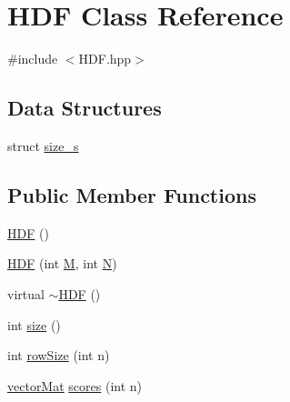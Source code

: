 \hypertarget{classHDF}{\section{\-H\-D\-F \-Class \-Reference}
\label{classHDF}
}


{\ttfamily \#include $<$\-H\-D\-F.\-hpp$>$}

\subsection*{\-Data \-Structures}
\begin{DoxyCompactItemize}
\item 
struct \hyperlink{structHDF_1_1size__s}{size\-\_\-s}
\end{DoxyCompactItemize}
\subsection*{\-Public \-Member \-Functions}
\begin{DoxyCompactItemize}
\item 
\hyperlink{classHDF_a1e33708a192cf30a7bf826b5d53d42cd}{\-H\-D\-F} ()
\item 
\hyperlink{classHDF_a7379039c6dbb9d1ef70bfb1857b9fd93}{\-H\-D\-F} (int \hyperlink{classHDF_aee1593ceda7b33a941e52e9f6e998f51}{\-M}, int \hyperlink{classHDF_ab3b5c9aa5d584ac3aa16ee9c6d04c340}{\-N})
\item 
virtual \hyperlink{classHDF_ad204a0f509d106b76dac0cef51eba755}{$\sim$\-H\-D\-F} ()
\item 
int \hyperlink{classHDF_a33415e3a4a7b17ab5530db3335b5c6f6}{size} ()
\item 
int \hyperlink{classHDF_aae50caafa701b43d66325f81359ef9a6}{row\-Size} (int n)
\item 
\hyperlink{types_8hpp_a3207a7addcfa415d1c83622febcb1e9b}{vector\-Mat} \hyperlink{classHDF_a99fee1b4aa1d3d6e4a667831e108945a}{scores} (int n)
\end{DoxyCompactItemize}
